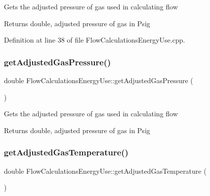 Gets the adjusted pressure of gas used in calculating flow

\begin{DoxyReturn}{Returns}
double, adjusted pressure of gas in Psig 
\end{DoxyReturn}


Definition at line 38 of file Flow\+Calculations\+Energy\+Use.\+cpp.

\mbox{\label{class_flow_calculations_energy_use_a8633821730568a5b1449914060c52aad}} 
\subsubsection{\texorpdfstring{get\+Adjusted\+Gas\+Pressure()}{getAdjustedGasPressure()}\hspace{0.1cm}{\footnotesize\ttfamily [3/3]}}
{\footnotesize\ttfamily double Flow\+Calculations\+Energy\+Use\+::get\+Adjusted\+Gas\+Pressure (\begin{DoxyParamCaption}{ }\end{DoxyParamCaption})}

Gets the adjusted pressure of gas used in calculating flow

\begin{DoxyReturn}{Returns}
double, adjusted pressure of gas in Psig 
\end{DoxyReturn}
\mbox{\label{class_flow_calculations_energy_use_a6efdcd6364e01577dda38dc49601df53}} 
\subsubsection{\texorpdfstring{get\+Adjusted\+Gas\+Temperature()}{getAdjustedGasTemperature()}\hspace{0.1cm}{\footnotesize\ttfamily [1/3]}}
{\footnotesize\ttfamily double Flow\+Calculations\+Energy\+Use\+::get\+Adjusted\+Gas\+Temperature (\begin{DoxyParamCaption}{ }\end{DoxyParamCaption})}

